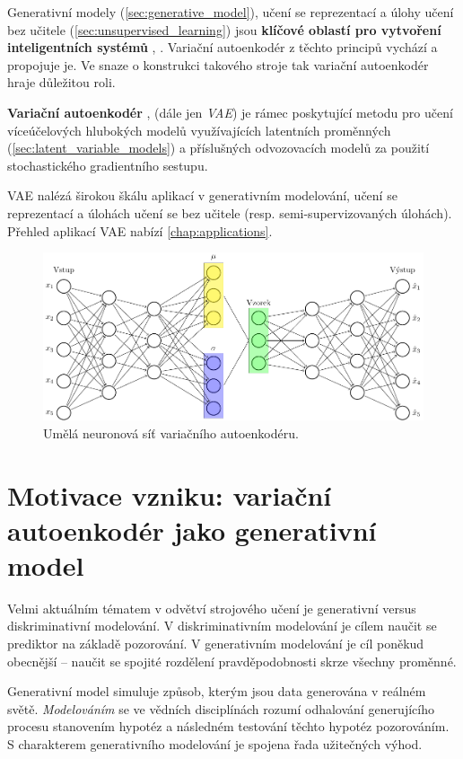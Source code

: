Generativní modely (\autoref{sec:generative_model}), učení se reprezentací \cite{Bengio2014} a úlohy učení bez učitele (\autoref{sec:unsupervised_learning}) jsou \textbf{klíčové oblastí pro vytvoření inteligentních systémů} \cite{Kingma2019}, \cite{LeCun2022}.
Variační autoenkodér z těchto principů vychází a propojuje je. Ve snaze o konstrukci takového stroje tak variační autoenkodér hraje důležitou roli.

\textbf{Variační autoenkodér} \cite{Kingma2014}, \cite{Rezende2014} (dále jen \emph{VAE})
je rámec poskytující metodu pro učení víceúčelových hlubokých modelů využívajících latentních proměnných (\autoref{sec:latent_variable_models})
a příslušných odvozovacích modelů
za použití stochastického gradientního sestupu. \cite{Kingma2019}

VAE nalézá širokou škálu aplikací v generativním modelování, učení se reprezentací a úlohách učení se bez učitele (resp. semi-supervizovaných úlohách).
Přehled aplikací VAE nabízí \autoref{chap:applications}.

\begin{figure}[H]
    \includegraphics[width=\textwidth]{figures/vae.pdf}
    \caption{Umělá neuronová síť variačního autoenkodéru.}
    \label{fig:vae_nn}
\end{figure}

\section{Motivace vzniku: variační autoenkodér jako generativní model}
Velmi aktuálním tématem v odvětví strojového učení je generativní versus diskriminativní modelování.
V diskriminativním modelování je cílem naučit se prediktor na základě pozorování.
V generativním modelování je cíl poněkud obecnější – naučit se spojité rozdělení pravděpodobnosti skrze všechny proměnné. \cite{Goodfellow2016}

Generativní model simuluje způsob, kterým jsou data generována v reálném světě.
\emph{Modelováním} se ve vědních disciplínách rozumí odhalování generujícího procesu stanovením hypotéz a následném testování těchto hypotéz pozorováním. 
S charakterem generativního modelování je spojena řada užitečných výhod. \cite{Goodfellow2016}

